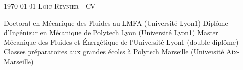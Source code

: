 \documentclass[alternative]{yaac-another-awesome-cv}
\begin{document}
\makecvheader
\makecvfooter
  {\textsc{\today}} %
  {\textsc{Loïc Reynier - CV}}
  {\thepage}

\begin{scholarship}
    {Doctorat en Mécanique des Fluides au LMFA (Université Lyon1)}
    {Diplôme d'Ingénieur en Mécanique de Polytech Lyon (Université Lyon1)}
    {Master Mécanique des Fluides et Énergétique de l'Université Lyon1 (double diplôme)}
    {Classes préparatoires aux grandes écoles à Polytech Marseille (Université Aix-Marseille)}
\end{scholarship}

\end{document}
